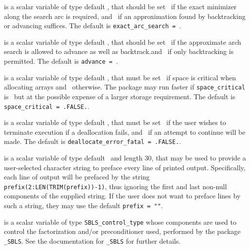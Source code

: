 \documentclass{galahad}
\begin{document}
\begin{description}
 is a scalar variable of type default \logical,
that should be set \true\ if the exact minimizer along the search arc is
required, and \false\ if an approximation found by backtracking or
advancing suffices.
The default is {\tt exact\_arc\_search = \true}.

 is a scalar variable of type default \logical, that should
be set \true\ if the approximate arch search is allowed to advance as
well as backtrack.and \false\ if only backtracking is permitted.
The default is {\tt advance = \true}.

 is a scalar variable of type default \logical,
that must be set \true\ if space is critical when allocating arrays
and  \false\ otherwise. The package may run faster if
{\tt space\_critical} is \false\ but at the possible expense of a larger
storage requirement. The default is {\tt space\_critical = .FALSE.}.

 is a scalar variable of type default \logical,
that must be set \true\ if the user wishes to terminate execution if
a deallocation  fails, and \false\ if an attempt to continue
will be made. The default is {\tt deallocate\_error\_fatal = .FALSE.}.

 is a scalar variable of type default \character\
and length 30, that may be used to provide a user-selected
character string to preface every line of printed output.
Specifically, each line of output will be prefaced by the string
{\tt prefix(2:LEN(TRIM(prefix))-1)},
thus ignoring the first and last non-null components of the
supplied string. If the user does not want to preface lines by such
a string, they may use the default {\tt prefix = ""}.

 is a scalar variable of type
{\tt SBLS\_control\_type} %
whose components are used to control the factorization and/or
preconditioner used,
performed by the package
{\tt \libraryname\_SBLS}.
See the documentation for {\tt \libraryname\_SBLS} for further details.

\end{description}

\end{document}
